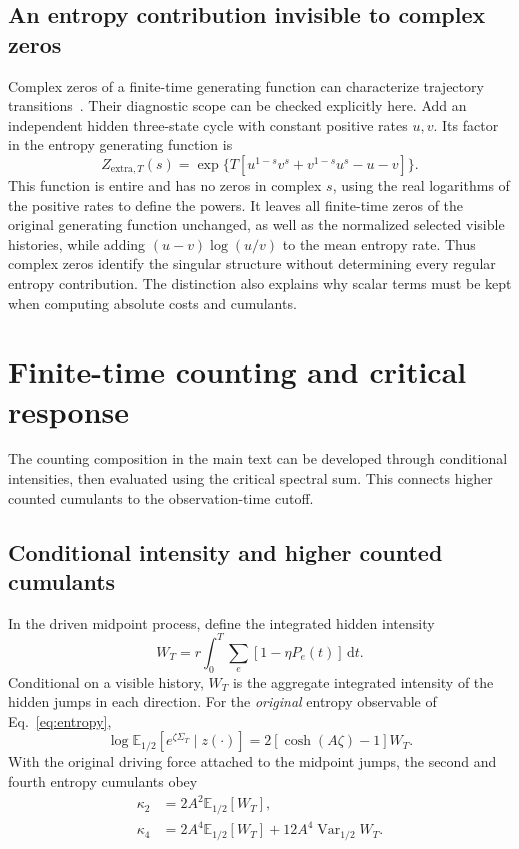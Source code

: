 \documentclass[aps,pre,reprint,amsmath,amssymb,longbibliography,floatfix]{revtex4-2}
\newcommand{\E}{\mathbb E}
\newcommand{\dd}{\,\mathrm d}
\newcommand{\Var}{\operatorname{Var}}
\begin{document}
\subsection{An entropy contribution invisible to complex zeros}
Complex zeros of a finite-time generating function can characterize
trajectory transitions~\cite{FlindtGarrahan2013}. Their diagnostic
scope can be checked explicitly here. Add an independent hidden
three-state cycle with constant positive rates $u,v$. Its factor in
the entropy generating function is
\begin{equation}
 Z_{\mathrm{extra},T}(s)
 =\exp\{T\left[u^{1-s}v^s+v^{1-s}u^s-u-v\right]\}.
 \label{eq:zero-free}
\end{equation}
This function is entire and has no zeros in complex $s$, using the
real logarithms of the positive rates to define the powers. It leaves
all finite-time zeros of the original generating function unchanged,
as well as the normalized selected visible histories, while adding
$(u-v)\log(u/v)$ to the mean entropy rate. Thus complex zeros identify
the singular structure without determining every regular entropy
contribution. The distinction also explains why scalar terms must
be kept when computing absolute costs and cumulants.

\section{Finite-time counting and critical response}
\label{app:finite-time-counts}
The counting composition in the main text can be developed through
conditional intensities, then evaluated using the critical spectral sum.
This connects higher counted cumulants to the observation-time cutoff.

\subsection{Conditional intensity and higher counted cumulants}
In the driven midpoint process, define the integrated hidden intensity
\begin{equation}
 W_T=r\int_0^T\sum_e\left[1-\eta P_e(t)\right]\dd t.
 \label{eq:W}
\end{equation}
Conditional on a visible history, $W_T$ is the aggregate integrated
intensity of the hidden jumps in each direction.
For the \emph{original} entropy observable of Eq.~\eqref{eq:entropy},
\begin{equation}
 \log\E_{1/2}\left[e^{\zeta\Sigma_T}\mid z(\cdot)\right]
 =2\left[\cosh(A\zeta)-1\right]W_T.
 \label{eq:midpoisson}
\end{equation}
With the original driving force attached to the midpoint jumps,
the second and fourth entropy cumulants obey
\begin{equation}
 \begin{aligned}
 \kappa_2&=2A^2\E_{1/2}\left[W_T\right],\\
 \kappa_4&=2A^4\E_{1/2}\left[W_T\right]+12A^4\Var_{1/2}W_T.
 \end{aligned}
 \label{eq:cumulantbridge}
\end{equation}
\end{document}

